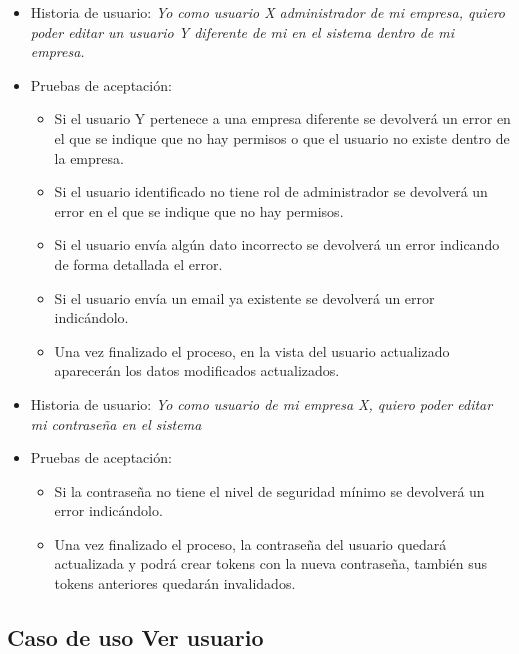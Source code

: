 \documentclass[12pt,a4paperpaper,]{report}
\providecommand{\tightlist}{%
  \setlength{\itemsep}{0pt}\setlength{\parskip}{0pt}}
\begin{document}
\begin{itemize}
\tightlist
\item
  Historia de usuario: \emph{Yo como usuario X administrador de mi
  empresa, quiero poder editar un usuario Y diferente de mi en el
  sistema dentro de mi empresa.}
\item
  Pruebas de aceptación:

  \begin{itemize}
  \tightlist
  \item
    Si el usuario Y pertenece a una empresa diferente se devolverá un
    error en el que se indique que no hay permisos o que el usuario no
    existe dentro de la empresa.
  \item
    Si el usuario identificado no tiene rol de administrador se
    devolverá un error en el que se indique que no hay permisos.
  \item
    Si el usuario envía algún dato incorrecto se devolverá un error
    indicando de forma detallada el error.
  \item
    Si el usuario envía un email ya existente se devolverá un error
    indicándolo.
  \item
    Una vez finalizado el proceso, en la vista del usuario actualizado
    aparecerán los datos modificados actualizados.
  \end{itemize}
\item
  Historia de usuario: \emph{Yo como usuario de mi empresa X, quiero
  poder editar mi contraseña en el sistema}
\item
  Pruebas de aceptación:

  \begin{itemize}
  \tightlist
  \item
    Si la contraseña no tiene el nivel de seguridad mínimo se devolverá
    un error indicándolo.
  \item
    Una vez finalizado el proceso, la contraseña del usuario quedará
    actualizada y podrá crear tokens con la nueva contraseña, también
    sus tokens anteriores quedarán invalidados.
  \end{itemize}
\end{itemize}

\subsection{Caso de uso Ver usuario}\label{caso-de-uso-ver-usuario}
\end{document}
